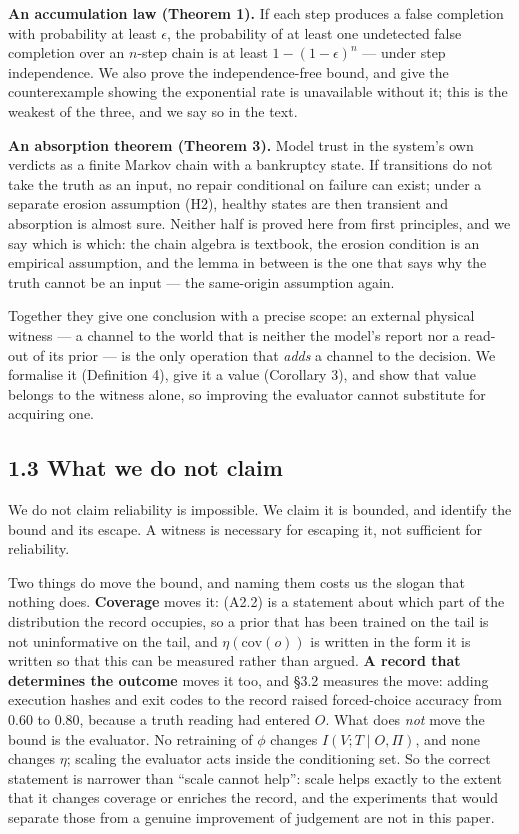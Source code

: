 \documentclass[11pt,a4paper]{article}
\newcounter{none}
\begin{document}
\textbf{An accumulation law (Theorem 1).} If each step produces a false completion
with probability at least \(\epsilon\), the probability of at least one undetected
false completion over an \(n\)-step chain is at least \(1-(1-\epsilon)^n\) --- under
step independence. We also prove the independence-free bound, and give the
counterexample showing the exponential rate is unavailable without it; this is
the weakest of the three, and we say so in the text.

\textbf{An absorption theorem (Theorem 3).} Model trust in the system's own verdicts
as a finite Markov chain with a bankruptcy state. If transitions do not take the
truth as an input, no repair conditional on failure can exist; under a separate
erosion assumption (H2), healthy states are then transient and absorption is almost
sure. Neither half is proved here from first principles, and we say which is which:
the chain algebra is textbook, the erosion condition is an empirical assumption, and
the lemma in between is the one that says why the truth cannot be an input --- the
same-origin assumption again.

Together they give one conclusion with a precise scope: an external physical
witness --- a channel to the world that is neither the model's report nor a
read-out of its prior --- is the only operation that \emph{adds} a channel to the decision.
We formalise it (Definition 4), give it a value (Corollary 3), and show that value
belongs to the witness alone, so improving the evaluator cannot substitute for
acquiring one.

\subsection{1.3 What we do not claim}\label{what-we-do-not-claim}

We do not claim reliability is impossible. We claim it is bounded, and identify
the bound and its escape. A witness is necessary for escaping it, not sufficient
for reliability.

Two things do move the bound, and naming them costs us the slogan that nothing
does. \textbf{Coverage} moves it: (A2.2) is a statement about which part of the
distribution the record occupies, so a prior that has been trained on the tail is
not uninformative on the tail, and \(\eta(\mathrm{cov}(o))\) is written in the form
it is written so that this can be measured rather than argued. \textbf{A record that
determines the outcome} moves it too, and §3.2 measures the move: adding execution
hashes and exit codes to the record raised forced-choice accuracy from \(0.60\) to
\(0.80\), because a truth reading had entered \(O\). What does \emph{not} move the bound is
the evaluator. No retraining of \(\phi\) changes \(I(V;T\mid O,\Pi)\), and none changes
\(\eta\); scaling the evaluator acts inside the conditioning set. So the correct
statement is narrower than ``scale cannot help'': scale helps exactly to the extent
that it changes coverage or enriches the record, and the experiments that would
separate those from a genuine improvement of judgement are not in this paper.
\end{document}
